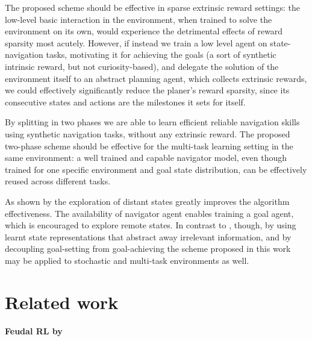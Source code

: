 \documentclass{article}
\begin{document}
The proposed scheme should be effective in sparse extrinsic reward settings: the low-level basic interaction in the environment, when trained to solve the environment on its own, would experience the detrimental effects of reward sparsity most acutely. However, if instead we train a low level agent on state-navigation tasks, motivating it for achieving the goals (a sort of synthetic intrinsic reward, but not curiosity-based), and delegate the solution of the environment itself to an abstract planning agent, which collects extrinsic rewards, we could effectively significantly reduce the planer's reward sparsity, since its consecutive states and actions are the milestones it sets for itself.

By splitting in two phases we are able to learn efficient reliable navigation skills using synthetic navigation tasks, 
without any extrinsic reward.
%
The proposed two-phase scheme should be effective for the multi-task learning setting in the same environment: a well trained and capable navigator model, even though trained for one specific environment and goal state distribution, can be effectively reused across different tasks.

As shown by \citet{ecoffet_first_2021} the exploration of distant states greatly improves the algorithm effectiveness. The availability of navigator agent enables training a goal agent, which is encouraged to explore remote states.
%
In contrast to \citep{ecoffet_first_2021}, though, by using learnt state representations that abstract away irrelevant information, and by decoupling goal-setting from goal-achieving the scheme proposed in this work may be applied to stochastic and multi-task environments as well.

\section{Related work}
\label{sec:related_work}

\paragraph{Feudal RL by~\citet{Dayan1992FeudalRL}} %
\label{par:feudal_rl}
\end{document}
